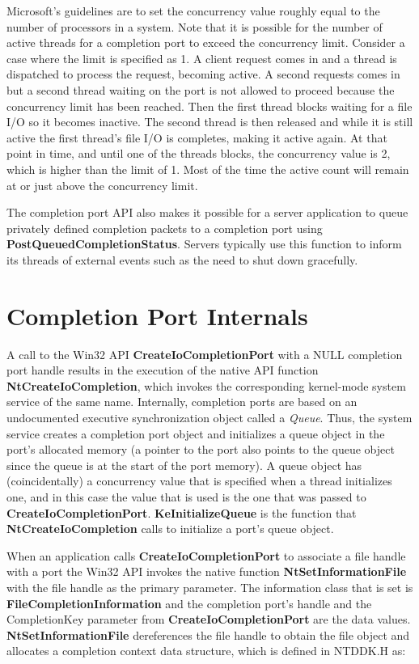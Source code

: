 \documentclass[a4paper,12pt,notitlepage,twoside,openright]{article}
\begin{document}
Microsoft's guidelines are to set the concurrency value roughly equal to the number of processors in a system. Note that it is possible for the number of active threads for a completion port to exceed the concurrency limit. Consider a case where the limit is specified as 1. A client request comes in and a thread is dispatched to process the request, becoming active. A second requests comes in but a second thread waiting on the port is not allowed to proceed because the concurrency limit has been reached. Then the first thread blocks waiting for a file I/O so it becomes inactive. The second thread is then released and while it is still active the first thread's file I/O is completes, making it active again. At that point in time, and until one of the threads blocks, the concurrency value is 2, which is higher than the limit of 1. Most of the time the active count will remain at or just above the concurrency limit.

The completion port API also makes it possible for a server application to queue privately defined completion packets to a completion port using \textbf{PostQueuedCompletionStatus}. Servers typically use this function to inform its threads of external events such as the need to shut down gracefully.

\section{Completion Port Internals}

A call to the Win32 API \textbf{CreateIoCompletionPort} with a NULL completion port handle results in the execution of the native API function \textbf{NtCreateIoCompletion}, which invokes the corresponding kernel-mode system service of the same name. Internally, completion ports are based on an undocumented executive synchronization object called a \emph{Queue}. Thus, the system service creates a completion port object and initializes a queue object in the port's allocated memory (a pointer to the port also points to the queue object since the queue is at the start of the port memory). A queue object has (coincidentally) a concurrency value that is specified when a thread initializes one, and in this case the value that is used is the one that was passed to \textbf{CreateIoCompletionPort}. \textbf{KeInitializeQueue} is the function that \textbf{NtCreateIoCompletion} calls to initialize a port's queue object.

When an application calls \textbf{CreateIoCompletionPort} to associate a file handle with a port the Win32 API invokes the native function \textbf{NtSetInformationFile} with the file handle as the primary parameter. The information class that is set is \textbf{FileCompletionInformation} and the completion port's handle and the CompletionKey parameter from \textbf{CreateIoCompletionPort} are the data values. \textbf{NtSetInformationFile} dereferences the file handle to obtain the file object and allocates a completion context data structure, which is defined in NTDDK.H as:
\end{document}
